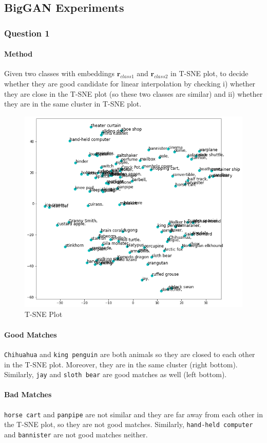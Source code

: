 \documentclass{article}
\begin{document}
	\subsection{BigGAN Experiments}
	\subsubsection{Question 1}
	\paragraph{Method} Given two classes with embeddings $\mathbf{r}_{class1}$ and $\mathbf{r}_{class2}$ in T-SNE plot, to decide whether they are good candidate for linear interpolation by checking i) whether they are close in the T-SNE plot (so these two classes are similar) and ii) whether they are in the same cluster in T-SNE plot.

	\begin{figure}[H]
		\caption{T-SNE Plot}
		\centering
		\label{tsne}
		\medbreak
		\includegraphics[width=0.7\linewidth]{./tsne2.png}
	\end{figure}
	
	\paragraph{Good Matches} \texttt{Chihuahua} and \texttt{king penguin} are both animals so they are closed to each other in the T-SNE plot. Moreover, they are in the same cluster (right bottom). Similarly, \texttt{jay} and \texttt{sloth bear} are good matches as well (left bottom).
	
	\paragraph{Bad Matches} \texttt{horse cart} and \texttt{panpipe} are not similar and they are far away from each other in the T-SNE plot, so they are not good matches. Similarly, \texttt{hand-held computer} and \texttt{bannister} are not good matches neither.
	
\end{document}
